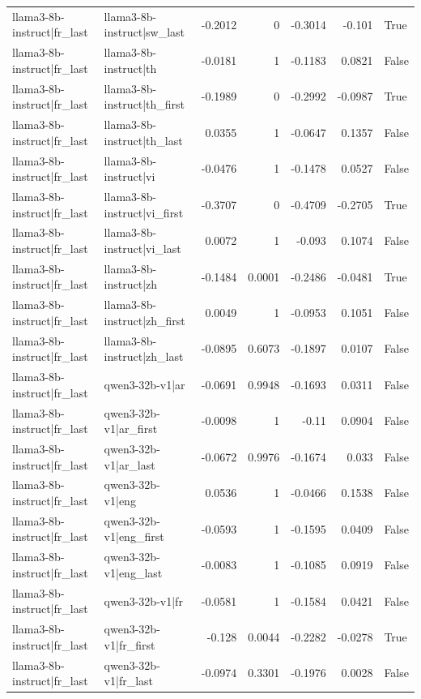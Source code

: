 \begin{table}
\begin{tabular}{l l r r r r l}
llama3-8b-instruct|fr_last & llama3-8b-instruct|sw_last & -0.2012 & 0 & -0.3014 & -0.101 & True \\
llama3-8b-instruct|fr_last & llama3-8b-instruct|th & -0.0181 & 1 & -0.1183 & 0.0821 & False \\
llama3-8b-instruct|fr_last & llama3-8b-instruct|th_first & -0.1989 & 0 & -0.2992 & -0.0987 & True \\
llama3-8b-instruct|fr_last & llama3-8b-instruct|th_last & 0.0355 & 1 & -0.0647 & 0.1357 & False \\
llama3-8b-instruct|fr_last & llama3-8b-instruct|vi & -0.0476 & 1 & -0.1478 & 0.0527 & False \\
llama3-8b-instruct|fr_last & llama3-8b-instruct|vi_first & -0.3707 & 0 & -0.4709 & -0.2705 & True \\
llama3-8b-instruct|fr_last & llama3-8b-instruct|vi_last & 0.0072 & 1 & -0.093 & 0.1074 & False \\
llama3-8b-instruct|fr_last & llama3-8b-instruct|zh & -0.1484 & 0.0001 & -0.2486 & -0.0481 & True \\
llama3-8b-instruct|fr_last & llama3-8b-instruct|zh_first & 0.0049 & 1 & -0.0953 & 0.1051 & False \\
llama3-8b-instruct|fr_last & llama3-8b-instruct|zh_last & -0.0895 & 0.6073 & -0.1897 & 0.0107 & False \\
llama3-8b-instruct|fr_last & qwen3-32b-v1|ar & -0.0691 & 0.9948 & -0.1693 & 0.0311 & False \\
llama3-8b-instruct|fr_last & qwen3-32b-v1|ar_first & -0.0098 & 1 & -0.11 & 0.0904 & False \\
llama3-8b-instruct|fr_last & qwen3-32b-v1|ar_last & -0.0672 & 0.9976 & -0.1674 & 0.033 & False \\
llama3-8b-instruct|fr_last & qwen3-32b-v1|eng & 0.0536 & 1 & -0.0466 & 0.1538 & False \\
llama3-8b-instruct|fr_last & qwen3-32b-v1|eng_first & -0.0593 & 1 & -0.1595 & 0.0409 & False \\
llama3-8b-instruct|fr_last & qwen3-32b-v1|eng_last & -0.0083 & 1 & -0.1085 & 0.0919 & False \\
llama3-8b-instruct|fr_last & qwen3-32b-v1|fr & -0.0581 & 1 & -0.1584 & 0.0421 & False \\
llama3-8b-instruct|fr_last & qwen3-32b-v1|fr_first & -0.128 & 0.0044 & -0.2282 & -0.0278 & True \\
llama3-8b-instruct|fr_last & qwen3-32b-v1|fr_last & -0.0974 & 0.3301 & -0.1976 & 0.0028 & False \\

\end{tabular}
\end{table}
